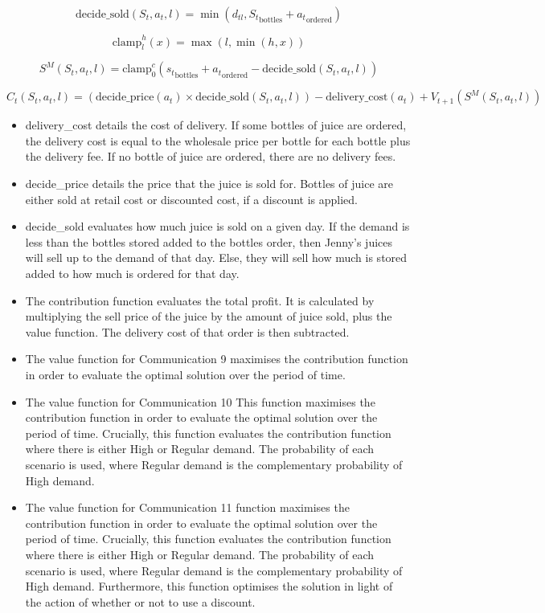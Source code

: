 \documentclass[a4paper]{article}
\begin{document}
\[\text{decide\_sold}(S_t, a_t, l) = \min(d_{tl}, {S_t}_{\text{bottles}} + {a_t}_{\text{ordered}})\]

\[\text{clamp}_{l}^{h}(x)=\max(l,\min(h,x))\]

\[S^M (S_t, a_t, l) = \text{clamp}_{0}^{c}({s_t}_{\text{bottles}} + {a_t}_{\text{ordered}} - \text{decide\_sold}(S_t, a_t, l))\]

\[C_t(S_t, a_t, l) = (\text{decide\_price}(a_t) \times \text{decide\_sold}(S_t, a_t, l)) - \text{delivery\_cost}(a_t) + V_{t + 1}(S^M (S_t, a_t, l))\]

\begin{itemize}
\item delivery\_cost details the cost of delivery. If some bottles of juice are ordered, the delivery cost is equal to the wholesale price per bottle for each bottle plus the delivery fee. If no bottle of juice are ordered, there are no delivery fees. 
\item decide\_price details the price that the juice is sold for. Bottles of juice are either sold at retail cost or discounted cost, if a discount is applied. 
\item decide\_sold evaluates how much juice is sold on a given day. If the demand is less than the bottles stored added to the bottles order, then Jenny's juices will sell up to the demand of that day. Else, they will sell how much is stored added to how much is ordered for that day. 
\item The contribution function evaluates the total profit. It is calculated by multiplying the sell price of the juice by the amount of juice sold, plus the value function. The delivery cost of that order is then subtracted. 
\item The value function for Communication 9 maximises the contribution function in order to evaluate the optimal solution over the period of time. 
\item The value function for Communication 10 
	This function maximises the contribution function in order to evaluate the optimal solution over the period of time. Crucially, this function evaluates the contribution function where there is either High or Regular demand. The probability of each scenario is used, where Regular demand is the complementary probability of High demand. 
\item The value function for Communication 11 function maximises the contribution function in order to evaluate the optimal solution over the period of time. Crucially, this function evaluates the contribution function where there is either High or Regular demand. The probability of each scenario is used, where Regular demand is the complementary probability of High demand. Furthermore, this function optimises the solution in light of the action of whether or not to use a discount. 
\end{itemize}
\end{document}
